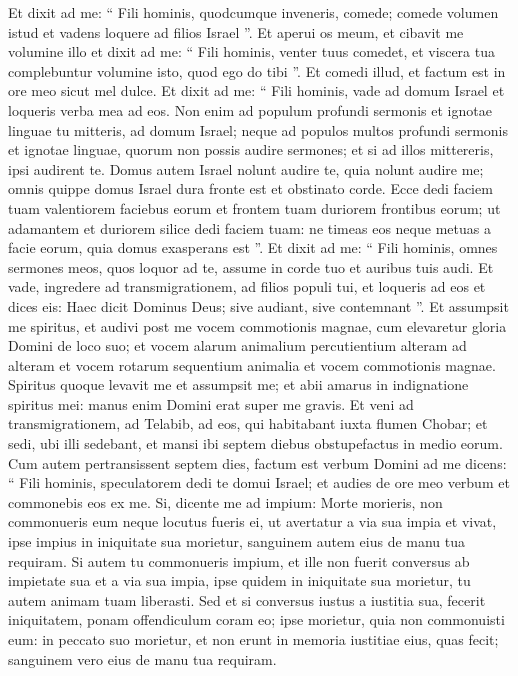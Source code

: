 \begin{biblechapter}
\begin{biblechapter}
\begin{biblechapter}
\verse Et dixit ad me: “ Fili hominis, quodcumque inveneris, comede; comede volumen istud et vadens loquere ad filios Israel ”. 
\verse Et aperui os meum, et cibavit me volumine illo 
\verse et dixit ad me: “ Fili hominis, venter tuus comedet, et viscera tua complebuntur volumine isto, quod ego do tibi ”. Et comedi illud, et factum est in ore meo sicut mel dulce. 
\verse Et dixit ad me: “ Fili hominis, vade ad domum Israel et loqueris verba mea ad eos. 
\verse Non enim ad populum profundi sermonis et ignotae linguae tu mitteris, ad domum Israel; 
 \verse neque ad populos multos profundi sermonis et ignotae linguae, quorum non possis audire sermones; et si ad illos mittereris, ipsi audirent te. 
\verse Domus autem Israel nolunt audire te, quia nolunt audire me; omnis quippe domus Israel dura fronte est et obstinato corde. 
\verse Ecce dedi faciem tuam valentiorem faciebus eorum et frontem tuam duriorem frontibus eorum; 
\verse ut adamantem et duriorem silice dedi faciem tuam: ne timeas eos neque metuas a facie eorum, quia domus exasperans est ”. 
\verse Et dixit ad me: “ Fili hominis, omnes sermones meos, quos loquor ad te, assume in corde tuo et auribus tuis audi. 
\verse Et vade, ingredere ad transmigrationem, ad filios populi tui, et loqueris ad eos et dices eis: Haec dicit Dominus Deus; sive audiant, sive contemnant ”.
 \verse Et assumpsit me spiritus, et audivi post me vocem commotionis magnae, cum elevaretur gloria Domini de loco suo; 
\verse et vocem alarum animalium percutientium alteram ad alteram et vocem rotarum sequentium animalia et vocem commotionis magnae. 
\verse Spiritus quoque levavit me et assumpsit me; et abii amarus in indignatione spiritus mei: manus enim Domini erat super me gravis. 
 \verse Et veni ad transmigrationem, ad Telabib, ad eos, qui habitabant iuxta flumen Chobar; et sedi, ubi illi sedebant, et mansi ibi septem diebus obstupefactus in medio eorum.
 \verse Cum autem pertransissent septem dies, factum est verbum Domini ad me dicens: 
\verse “ Fili hominis, speculatorem dedi te domui Israel; et audies de ore meo verbum et commonebis eos ex me. 
\verse Si, dicente me ad impium: Morte morieris, non commonueris eum neque locutus fueris ei, ut avertatur a via sua impia et vivat, ipse impius in iniquitate sua morietur, sanguinem autem eius de manu tua requiram. 
\verse Si autem tu commonueris impium, et ille non fuerit conversus ab impietate sua et a via sua impia, ipse quidem in iniquitate sua morietur, tu autem animam tuam liberasti. 
\verse Sed et si conversus iustus a iustitia sua, fecerit iniquitatem, ponam offendiculum coram eo; ipse morietur, quia non commonuisti eum: in peccato suo morietur, et non erunt in memoria iustitiae eius, quas fecit; sanguinem vero eius de manu tua requiram. 

\end{biblechapter}
\end{biblechapter}
\end{biblechapter}
